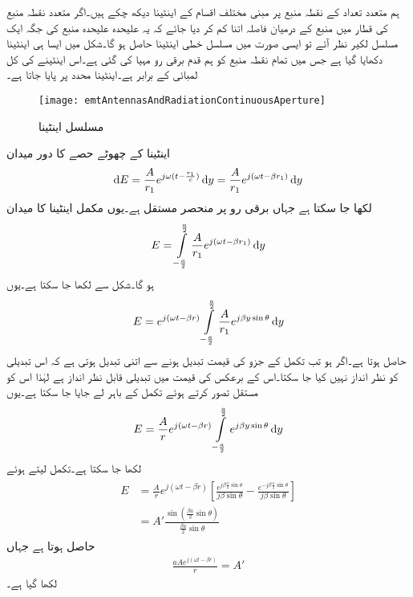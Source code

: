 ہم متعدد تعداد کے نقطہ منبع پر مبنی مختلف اقسام کے اینٹینا دیکھ چکے ہیں۔اگر متعدد نقطہ منبع کی قطار میں منبع کے درمیان فاصلہ اتنا کم کر دیا جائے کہ یہ علیحدہ علیحدہ منبع کی جگہ ایک مسلسل لکیر نظر آئے تو ایسی صورت میں مسلسل خطی اینٹینا حاصل ہو گا۔شکل  میں ایسا ہی اینٹینا دکھایا گیا ہے جس میں تمام نقطہ منبع کو ہم قدم برقی رو مہیا کی گئی ہے۔اس اینٹینے کی کل لمبائی  کے برابر ہے۔اینٹینا  محدد پر پایا جاتا ہے۔  

\begin{figure}
\centering
\texttt{[image: emtAntennasAndRadiationContinuousAperture]}
\caption{مسلسل اینٹینا}
\label{شکل_اینٹینا_مسلسل_اینٹینا}
\end{figure}

اینٹینا کے چھوٹے حصے  کا دور میدان 
\begin{align}
\dif E=\frac{A}{r_1} e^{j\omega (t -\frac{r_1}{c})} \dif y=\frac{A}{r_1} e^{j(\omega t -\beta r_1)} \dif y
\end{align}
لکھا جا سکتا ہے جہاں  برقی رو پر منحصر مستقل ہے۔یوں مکمل اینٹینا کا میدان
\begin{align}
E=\int \limits_{-\frac{a}{2}}^{\frac{a}{2}} \frac{A}{r_1} e^{j(\omega t -\beta r_1)} \dif y
\end{align}
ہو گا۔شکل سے  لکھا جا سکتا ہے۔یوں
\begin{align}
E=e^{j(\omega t -\beta r)}\int \limits_{-\frac{a}{2}}^{\frac{a}{2}} \frac{A}{r_1} e^{j \beta y\sin \theta} \dif y
\end{align}
حاصل ہوتا ہے۔اگر  ہو تب تکمل کے  جزو کی قیمت  تبدیل ہونے سے  اتنی تبدیل ہوتی ہے کہ اس تبدیلی کو نظر انداز نہیں کیا جا سکتا۔اس کے برعکس  کی قیمت میں تبدیلی قابل نظر انداز ہے لہٰذا اس کو مستقل  تصور کرتے ہوئے تکمل کے باہر لے جایا جا سکتا ہے۔یوں  
\begin{align}
E=\frac{A}{r}e^{j(\omega t -\beta r)}\int \limits_{-\frac{a}{2}}^{\frac{a}{2}} e^{j \beta y\sin \theta} \dif y
\end{align}
لکھا جا سکتا ہے۔تکمل لیتے ہوئے
\begin{gather}
\begin{aligned}\label{مساوات_اینٹینا_مسلسل}
E&=\frac{A}{r}e^{j(\omega t -\beta r)} \left[\frac{e^{j \beta\frac{a}{2} \sin \theta}}{j \beta\sin \theta} -\frac{e^{-j \beta\frac{a}{2} \sin \theta}}{j \beta\sin \theta} \right]\\
&=A' \frac{\sin \left(\frac{\beta a }{2} \sin \theta \right)}{\frac{\beta a }{2}\sin \theta}
\end{aligned}
\end{gather}
حاصل ہوتا ہے جہاں
\begin{align*}
\frac{a Ae^{j(\omega t -\beta r)}}{r}=A'
\end{align*}
لکھا گیا ہے۔

